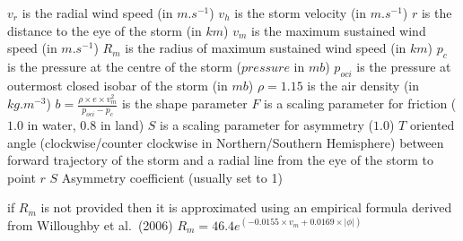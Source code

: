 \documentclass[
]{article}
\begin{document}
\(v_r\) is the radial wind speed (in \(m.s^{-1}\)) \(v_h\) is the storm
velocity (in \(m.s^{-1}\)) \(r\) is the distance to the eye of the storm
(in \(km\)) \(v_m\) is the maximum sustained wind speed (in
\(m.s^{-1}\)) \(R_m\) is the radius of maximum sustained wind speed (in
\(km\)) \(p_c\) is the pressure at the centre of the storm (\(pressure\)
in \(mb\)) \(p_{oci}\) is the pressure at outermost closed isobar of the
storm (in \(mb\)) \(\rho = 1.15\) is the air density (in \(kg.m^{-3}\))
\(b = \frac{\rho \times e \times v_m^2}{p_{oci} - p_c}\) is the shape
parameter \(F\) is a scaling parameter for friction (\(1.0\) in water,
\(0.8\) in land) \(S\) is a scaling parameter for asymmetry (\(1.0\))
\(T\) oriented angle (clockwise/counter clockwise in Northern/Southern
Hemisphere) between forward trajectory of the storm and a radial line
from the eye of the storm to point \(r\) \(S\) Asymmetry coefficient
(usually set to 1)

if \(R_m\) is not provided then it is approximated using an empirical
formula derived from Willoughby et al.~(2006)
\(R_m = 46.4e^{(-0.0155 \times v_m + 0.0169 \times |\phi|)}\)
\end{document}
